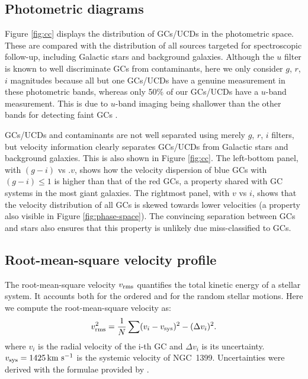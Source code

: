 \documentclass[useAMS,usenatbib]{mn2e}
\newcommand{\kms}{\mbox{\,km~s$^{-1}$}}
\begin{document}
\subsection{Photometric diagrams}


Figure \ref{fig:cc} displays the distribution of GCs/UCDs in the photometric space. These are compared with the distribution of all sources targeted for spectroscopic follow-up, including Galactic stars and background galaxies. Although the $u$ filter is known to well discriminate GCs from contaminants, here we only consider $g$, $r$, $i$ magnitudes because all but one GCs/UCDs have a genuine measurement in these photometric bands, whereas only 50\% of our GCs/UCDs have a $u$-band measurement. This is due to $u$-band imaging being shallower than the other bands for detecting faint GCs \citep{DAbrusco16}.

GCs/UCDs and contaminants are not well separated using merely $g$, $r$, $i$ filters, but velocity information clearly separates GCs/UCDs from Galactic stars and background galaxies. This is also shown in Figure \ref{fig:cc}. The left-bottom panel, with $(g-i)$ vs .$v$, shows how the velocity dispersion of blue GCs with $(g-i) \le 1$ is higher than that of the red GCs, a property shared with GC systems in the most giant galaxies. The rightmost panel, with $v$ vs $i$, shows that the velocity distribution of all GCs is skewed towards lower velocities (a property also visible in Figure \ref{fig:phase-space}). The convincing separation between GCs and stars also ensures that this property is unlikely due miss-classified to GCs. 

\subsection{Root-mean-square velocity profile}
The root-mean-square velocity $v_{\rm rms}$ quantifies the total kinetic energy of a stellar system. It accounts both for the ordered and for the random stellar motions. Here we compute the root-mean-square velocity as:
\begin{equation}
v_{\rm rms}^2 = \frac{1}{N}  \sum (v_i - v_{\rm sys})^2 - (\Delta v_i)^2 .
\label{eq:sigma}
\end{equation}
where $v_i$ is the radial velocity of the i-th GC and $\Delta v_i$ is its uncertainty. $v_{\rm sys}=1425 \kms$ is the systemic velocity of NGC~1399. Uncertainties were derived with the formulae provided by \citet{Danese}. 
\end{document}
